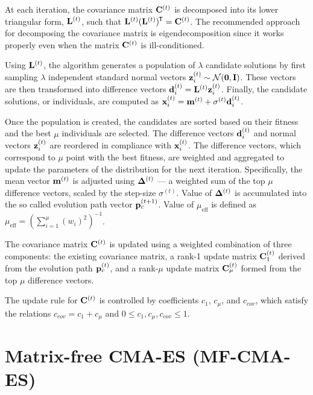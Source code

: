 \documentclass[dvipsnames,format=sigconf,anonymous=false,review=false]{acmart}
\begin{document}
At each iteration, the covariance matrix ${\bf C}^{(t)}$ is decomposed into its lower triangular form, ${\bf L}^{(t)}$, such that ${\bf L}^{(t)} ({\bf L}^{(t)})^{\mkern-1.5mu\mathsf{T}} = {\bf C}^{(t)}$. 
The recommended approach for decomposing the covariance matrix is eigendecomposition \cite{hansen2006cma} since it works properly even when the matrix ${\bf C}^{(t)}$ is ill-conditioned. 

Using ${\bf L}^{(t)}$, the algorithm generates a population of $\lambda$ candidate solutions by first sampling $\lambda$ independent standard normal vectors ${\bf z}_i^{(t)} \sim \mathcal{N}({\bf 0}, {\bf I})$. These vectors are then transformed into difference vectors ${\bf d}_i^{(t)} = {\bf L}^{(t)} {\bf z}_i^{(t)}$. Finally, the candidate solutions, or individuals, are computed as ${\bf x}_i^{(t)} = {\bf m}^{(t)} + \sigma^{(t)} {\bf d}_i^{(t)}$.

Once the population is created, the candidates are sorted based on their fitness and the best $\mu$ individuals are selected. The difference vectors ${\bf d}_i^{(t)}$ and normal vectors ${\bf z}_i^{(t)}$ are reordered in compliance with ${\bf x}_i^{(t)}$. The difference vectors, which correspond to $\mu$ point with the best fitness, are weighted and aggregated to update the parameters of the distribution for the next iteration. Specifically, the mean vector ${\bf m}^{(t)}$ is adjusted using ${\bf \Delta}^{(t)}$ --- a weighted sum of the top $\mu$ difference vectors, scaled by the step-size $\sigma^{(t)}$. 
Value of ${\bf \Delta}^{(t)}$ is accumulated into the so called evolution path vector ${\bf p}_c^{(t+1)}$. Value of $\mu_\text{eff}$ is defined as $\mu_\text{eff}=\left(\sum_{i=1}^\mu (w_i)^2\right)^{-1}$.

The covariance matrix ${\bf C}^{(t)}$ is updated using a weighted combination of three components: the existing covariance matrix, a rank-1 update matrix ${\bf C}_1^{(t)}$ derived from the evolution path ${\bf p}_c^{(t)}$, and a rank-$\mu$ update matrix ${\bf C}_\mu^{(t)}$ formed from the top $\mu$ difference vectors.

The update rule for ${\bf C}^{(t)}$ is controlled by coefficients $c_1$, $c_\mu$, and $c_{cov}$, which satisfy the relations $c_{cov} = c_1 + c_\mu$ and $0 \leq c_1, c_\mu, c_{cov} \leq 1$.

\section{Matrix-free CMA-ES (MF-CMA-ES)}
\end{document}
